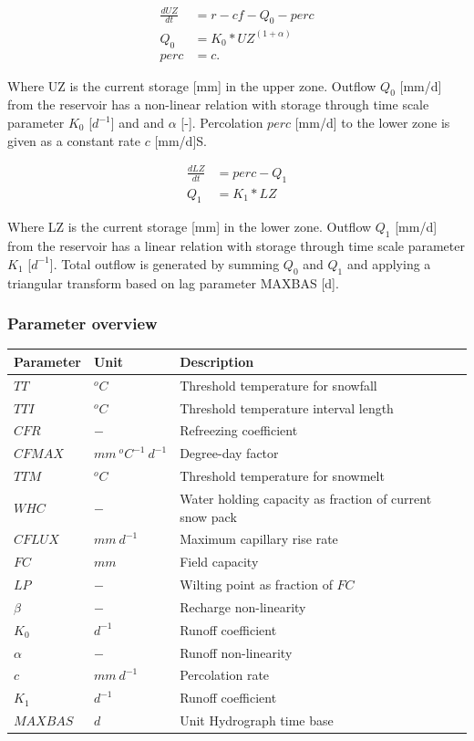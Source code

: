 \begin{align}
	\frac{dUZ}{dt} &= r-cf-Q_0-perc \\
	Q_0 &= K_0*UZ^{(1+\alpha)}\\
	perc &= c.
\end{align}

Where UZ is the current storage [mm] in the upper zone. Outflow $Q_0$ [mm/d] from the reservoir has a non-linear relation with storage through time scale parameter $K_0$ [$d^{-1}$] and and $\alpha$ [-]. Percolation $perc$ [mm/d] to the lower zone is given as a constant rate $c$ [mm/d]S.

\begin{align}
	\frac{dLZ}{dt} &= perc-Q_1 \\
	Q_1 &= K_1*LZ
\end{align}

Where LZ is the current storage [mm] in the lower zone. Outflow $Q_1$ [mm/d] from the reservoir has a linear relation with storage through time scale parameter $K_1$ [$d^{-1}$]. Total outflow is generated by summing $Q_0$ and $Q_1$ and applying a triangular transform based on lag parameter MAXBAS [d].

\subsubsection{Parameter overview}
\begin{table}[htbp]
  \centering
    \begin{tabular}{lll}
    \toprule
    Parameter & Unit  & Description \\
    \midrule
    $TT$  & $^oC$ & Threshold temperature for snowfall \\
    $TTI$ & $^oC$ & Threshold temperature interval length \\
    $CFR$ & $-$   & Refreezing coefficient \\
    $CFMAX$ & $mm~^oC^{-1}~d^{-1}$ & Degree-day factor \\
    $TTM$ & $^oC$ & Threshold temperature for snowmelt \\
    $WHC$ & $-$   & Water holding capacity as fraction of current snow pack \\
    $CFLUX$ & $mm~d^{-1}$ & Maximum capillary rise rate \\
    $FC$  & $mm$  & Field capacity \\
    $LP$  & $-$   & Wilting point as fraction of $FC$ \\
    $\beta$ & $-$   & Recharge non-linearity \\
    $K_0$ & $d^{-1}$ & Runoff coefficient \\
    $\alpha$ & $-$   & Runoff non-linearity \\
    $c$   & $mm~d^{-1}$ & Percolation rate \\
    $K_1$ & $d^{-1}$ & Runoff coefficient \\
    $MAXBAS$ & $d$   & Unit Hydrograph time base \\
    \bottomrule
    \end{tabular}%
  \label{tab:addlabel}%
\end{table}%


